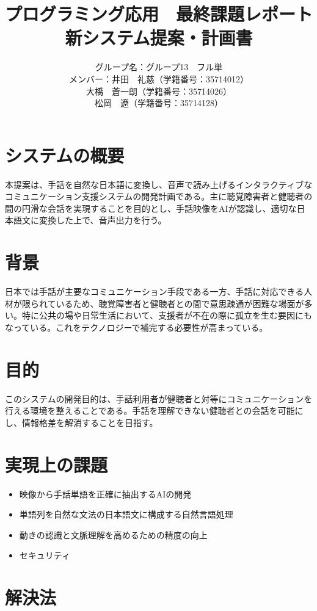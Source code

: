\documentclass[12pt,a4paper]{jsarticle}
\title{プログラミング応用　最終課題レポート\\
\large 新システム提案・計画書}
\author{
グループ名：グループ13　フル単\\
メンバー：井田　礼慈（学籍番号：35714012）\\
\quad\quad\quad 大橋　蒼一朗（学籍番号：35714026）\\
\quad\quad\quad 松岡　遼（学籍番号：35714128）\\
}
\begin{document}
\maketitle

\section{システムの概要}
本提案は、手話を自然な日本語に変換し、音声で読み上げるインタラクティブなコミュニケーション支援システムの開発計画である。主に聴覚障害者と健聴者の間の円滑な会話を実現することを目的とし、手話映像をAIが認識し、適切な日本語文に変換した上で、音声出力を行う。
\section{背景}

日本では手話が主要なコミュニケーション手段である一方、手話に対応できる人材が限られているため、聴覚障害者と健聴者との間で意思疎通が困難な場面が多い。特に公共の場や日常生活において、支援者が不在の際に孤立を生む要因にもなっている。これをテクノロジーで補完する必要性が高まっている。


\section{目的}

このシステムの開発目的は、手話利用者が健聴者と対等にコミュニケーションを行える環境を整えることである。手話を理解できない健聴者との会話を可能にし、情報格差を解消することを目指す。

\section{実現上の課題}

\begin{itemize}
    \item 映像から手話単語を正確に抽出するAIの開発
    \item 単語列を自然な文法の日本語文に構成する自然言語処理
    \item 動きの認識と文脈理解を高めるための精度の向上
    \item セキュリティ
\end{itemize}

\section{解決法}
\end{document}
